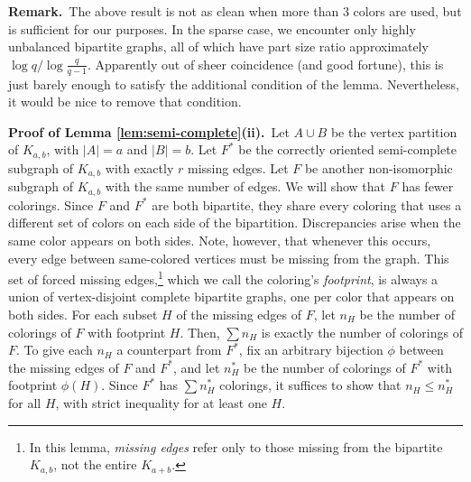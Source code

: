 \documentclass[11pt]{article}
\begin{document}
\noindent \textbf{Remark.}\, The above result is not as clean when
more than 3 colors are used, but is sufficient for our purposes.  In
the sparse case, we encounter only highly unbalanced bipartite graphs,
all of which have part size ratio approximately $\log q / \log
\frac{q}{q-1}$.  Apparently out of sheer coincidence (and good
fortune), this is just barely enough to satisfy the additional
condition of the lemma.  Nevertheless, it would be nice to remove that
condition.



\vspace{3mm}

\noindent \textbf{Proof of Lemma \ref{lem:semi-complete}(ii).}\, Let
$A \cup B$ be the vertex partition of $K_{a,b}$, with $|A| = a$ and
$|B| = b$.  Let $F^*$ be the correctly oriented semi-complete subgraph
of $K_{a,b}$ with exactly $r$ missing edges.  Let $F$ be another
non-isomorphic subgraph of $K_{a,b}$ with the same number of edges.
We will show that $F$ has fewer colorings.  Since $F$ and $F^*$ are
both bipartite, they share every coloring that uses a different set of
colors on each side of the bipartition.  Discrepancies arise when the
same color appears on both sides.  Note, however, that whenever this
occurs, every edge between same-colored vertices must be missing from
the graph.  This set of forced missing edges,\footnote{In this lemma,
  \emph{missing edges}\/ refer only to those missing from the
  bipartite $K_{a,b}$, not the entire $K_{a+b}$.}  which we call the
coloring's \emph{footprint}, is always a union of vertex-disjoint
complete bipartite graphs, one per color that appears on both sides.
For each subset $H$ of the missing edges of $F$, let $n_H$ be the
number of colorings of $F$ with footprint $H$.  Then, $\sum n_H$ is
exactly the number of colorings of $F$.  To give each $n_H$ a
counterpart from $F^*$, fix an arbitrary bijection $\phi$ between the
missing edges of $F$ and $F^*$, and let $n_H^*$ be the number of
colorings of $F^*$ with footprint $\phi(H)$.  Since $F^*$ has $\sum
n_H^*$ colorings, it suffices to show that $n_H \leq n_H^*$ for all
$H$, with strict inequality for at least one $H$.
\end{document}
